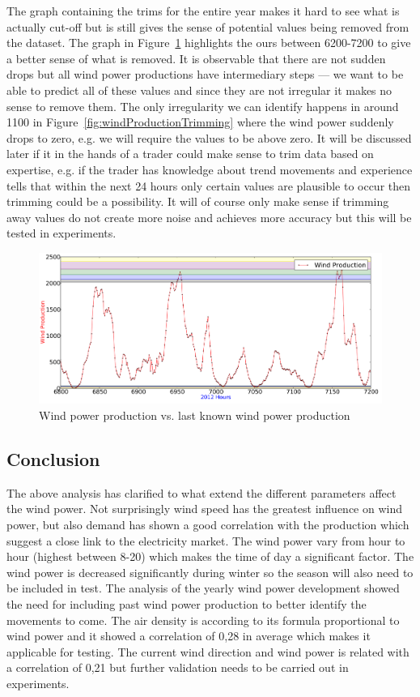 The graph containing the trims for the entire year makes it hard to see what is actually cut-off but is still gives the sense of potential values being removed from the dataset. The graph in Figure~\ref{fig:pointingOutPlaceWhereTrim} highlights the ours between 6200-7200 to give a better sense of what is removed. It is observable that there are not sudden drops but all wind power productions have intermediary steps --- we want to be able to predict all of these values and since they are not irregular it makes no sense to remove them. The only irregularity we can identify happens in around 1100 in Figure~\ref{fig:windProductionTrimming} where the wind power suddenly drops to zero, e.g. we will require the values to be above zero. It will be discussed later if it in the hands of a trader could make sense to trim data based on expertise, e.g. if the trader has knowledge about trend movements and experience tells that within the next 24 hours only certain values are plausible to occur then trimming could be a possibility. It will of course only make sense if trimming away values do not create more noise and achieves more accuracy but this will be tested in experiments.

\begin{figure}[H]
\centering
\includegraphics[width=0.99\linewidth]{billeder/pointingOutPlaceWhereTrim.png}
\caption{Wind power production vs. last known wind power production}
\label{fig:pointingOutPlaceWhereTrim}
\end{figure}

\subsection{Conclusion}
The above analysis has clarified to what extend the different parameters affect the wind power. Not surprisingly wind speed has the greatest influence on wind power, but also demand has shown a good correlation with the production which suggest a close link to the electricity market. The wind power vary from hour to hour (highest between 8-20) which makes the time of day a significant factor. The wind power is decreased significantly during winter so the season will also need to be included in test. The analysis of the yearly wind power development showed the need for including past wind power production to better identify the movements to come.
The air density is according to its formula proportional to wind power and it showed a correlation of 0,28 in average which makes it applicable for testing. The current wind direction and wind power is related with a correlation of 0,21 but further validation needs to be carried out in experiments.